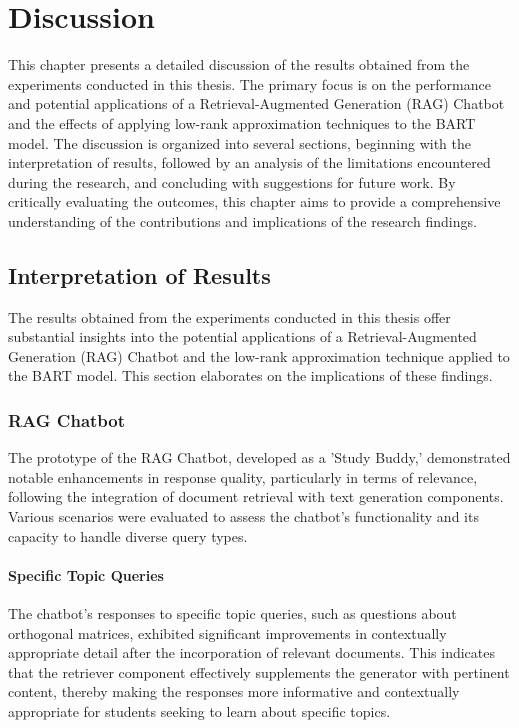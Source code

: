 \chapter{Discussion}\label{chap:discussion}

This chapter presents a detailed discussion of the results obtained from the experiments conducted in this thesis. The primary focus is on the performance and potential applications of a Retrieval-Augmented Generation (RAG) Chatbot and the effects of applying low-rank approximation techniques to the BART model. The discussion is organized into several sections, beginning with the interpretation of results, followed by an analysis of the limitations encountered during the research, and concluding with suggestions for future work. By critically evaluating the outcomes, this chapter aims to provide a comprehensive understanding of the contributions and implications of the research findings.

\section{Interpretation of Results}

The results obtained from the experiments conducted in this thesis offer substantial insights into the potential applications of a Retrieval-Augmented Generation (RAG) Chatbot and the low-rank approximation technique applied to the BART model. This section elaborates on the implications of these findings.

\subsection{RAG Chatbot}

The prototype of the RAG Chatbot, developed as a 'Study Buddy,' demonstrated notable enhancements in response quality, particularly in terms of relevance, following the integration of document retrieval with text generation components. Various scenarios were evaluated to assess the chatbot's functionality and its capacity to handle diverse query types.

\subsubsection{Specific Topic Queries}

The chatbot's responses to specific topic queries, such as questions about orthogonal matrices, exhibited significant improvements in contextually appropriate detail after the incorporation of relevant documents. This indicates that the retriever component effectively supplements the generator with pertinent content, thereby making the responses more informative and contextually appropriate for students seeking to learn about specific topics.

